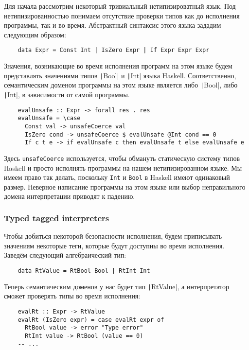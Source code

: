 Для начала рассмотрим некоторый тривиальный нетипизироватный язык.
Под нетипизированностью понимаем отсутствие проверки типов как до исполнения программы, так и во время.
Абстрактный синтаксис этого языка зададим следующим образом:
\begin{verbatim}
    data Expr = Const Int | IsZero Expr | If Expr Expr Expr
\end{verbatim}

Значения, возникающие во время исполнения программ на этом языке будем представлять значениями типов \texttt|Bool| и \texttt|Int| языка Haskell. %
Соответственно, семантическим доменом программы на этом языке является либо \texttt|Bool|, либо \texttt|Int|, в зависимости от самой программы.
\begin{verbatim}
    evalUnsafe :: Expr -> forall res . res
    evalUnsafe = \case
      Const val -> unsafeCoerce val
      IsZero cond -> unsafeCoerce $ evalUnsafe @Int cond == 0
      If c t e -> if evalUnsafe c then evalUnsafe t else evalUnsafe e
\end{verbatim}

Здесь \texttt{unsafeCoerce} используется, чтобы обмануть статическую систему типов Haskell и просто исполнять программы на нашем нетипизированном языке.
Мы имеем право так делать, поскольку \texttt{Int} и \texttt{Bool} в Haskell имеют одинаковый размер.
Неверное написание программы на этом языке или выбор неправильного домена интерпретации приводят к падению.

\subsubsection{Typed tagged interpreters}

Чтобы добиться некоторой безопасности исполнения, будем приписывать значениям некоторые теги, которые будут доступны во время исполнения.
Заведём следующий алгебраический тип:
\begin{verbatim}
    data RtValue = RtBool Bool | RtInt Int
\end{verbatim}

Теперь семантическим доменов у нас будет тип \texttt|RtValue|, а интерпретатор сможет проверять типы во время исполнения:
\begin{verbatim}
    evalRt :: Expr -> RtValue
    evalRt (IsZero expr) = case evalRt expr of
      RtBool value -> error "Type error"
      RtInt value -> RtBool (value == 0)
    -- ...
\end{verbatim}

